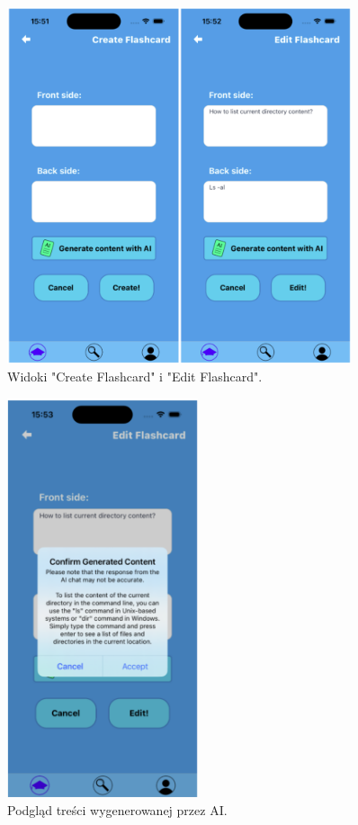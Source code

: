 \begin{figure}[H]
    \centering
    \includegraphics[width=0.9\textwidth]{chapters/chapter_10/images_mobile/mobile_create_flashcards}
    \caption{Widoki "Create Flashcard" i "Edit Flashcard".}
    \label{img:mobile_create_flashcards}
\end{figure}


\begin{figure}[H]
    \centering
    \includegraphics[width=0.5\textwidth]{chapters/chapter_10/images_mobile/mobile_chat}
    \caption{Podgląd treści wygenerowanej przez AI.}
    \label{img:mobile_chat}
\end{figure}


